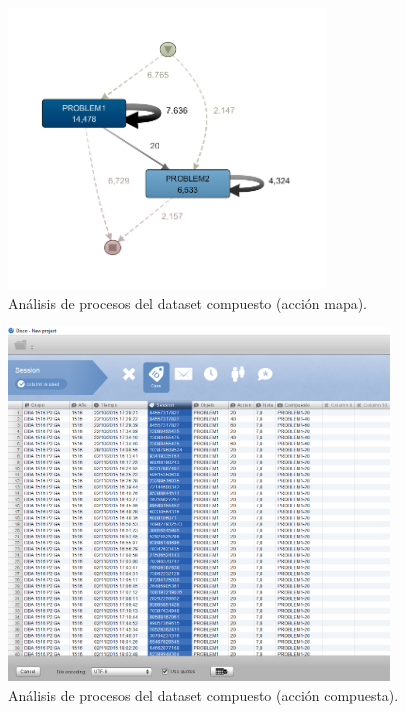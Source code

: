 \begin{figure}[H]
    \centering
    \includegraphics[width=0.75\textwidth]{imagenes/DISCO_map/Dataset Fusionado.png}
    \caption{Análisis de procesos del dataset compuesto (acción mapa).}
    \label{fig:datasetFusionado}
\end{figure}

\begin{figure}[H]
    \centering
    \includegraphics[width=0.90\textwidth]{imagenes/DISCO_compound/DISCO_cut.png}
    \caption{Análisis de procesos del dataset compuesto (acción compuesta).}
    \label{fig:DISCO2}
\end{figure}

